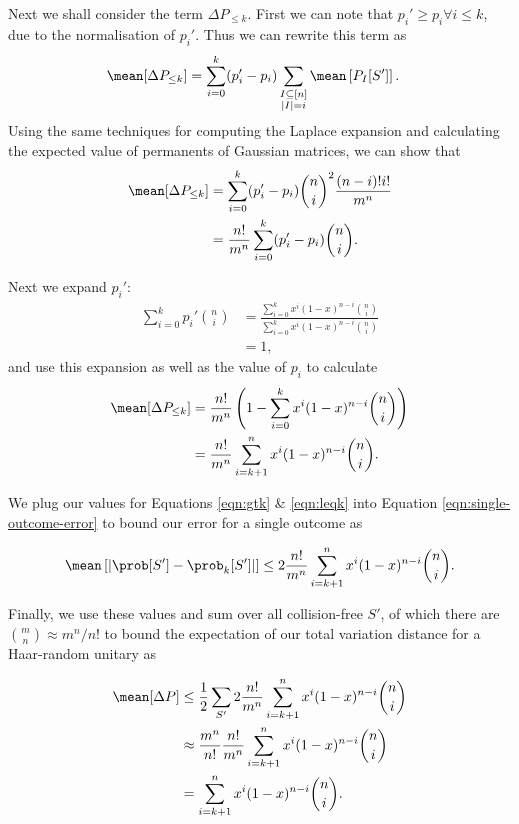 Next we shall consider the term $\Delta P_{\leq k}$. 
First we can note that $p_i' \geq p_i \forall i\leq k$, due to the normalisation of $p_i'$. 
Thus we can rewrite this term as
\begin{align}
\mean[\Delta P_{\leq k}] &= \sum_{i=0}^k(p_i'-p_i)\sum_{\substack{I\subseteq[n]\\|I|=i}}\mean\left[P_I[S']\right].
\end{align}
Using the same techniques for computing the Laplace expansion and calculating the expected value of permanents of Gaussian matrices, we can show that
\begin{align}
\mean[\Delta P_{\leq k}] &= \sum_{i=0}^k(p_i'-p_i)\binom{n}{i}^2\frac{(n-i)!i!}{m^n}\\
&= \frac{n!}{m^n}\sum_{i=0}^k(p_i'-p_i)\binom{n}{i}\label{eqn:gtk}.
\end{align}

Next we expand $p_i'$:
\begin{align}
\sum_{i=0}^kp_i'\binom{n}{i} &= \frac{\sum_{i=0}^kx^i(1-x)^{n-i}\binom{n}{i}}{\sum_{i=0}^kx^i(1-x)^{n-i}\binom{n}{i}}\\
&= 1,
\end{align}
and use this expansion as well as the value of $p_i$ to calculate
\begin{align}
\mean[\Delta P_{\leq k}] &= \frac{n!}{m^n}\left(1 - \sum_{i=0}^kx^i(1-x)^{n-i}\binom{n}{i}\right)\\
&= \frac{n!}{m^n}\sum_{i=k+1}^nx^i(1-x)^{n-i}\binom{n}{i}\label{eqn:leqk}.
\end{align}

We plug our values for Equations \ref{eqn:gtk} \& \ref{eqn:leqk} into Equation \ref{eqn:single-outcome-error} to bound our error for a single outcome as

\begin{equation}
\mean\left[|\prob[S']-\prob_k[S']|\right] \leq 2\frac{n!}{m^n}\sum_{i=k+1}^nx^i(1-x)^{n-i}\binom{n}{i}.
\end{equation}

Finally, we use these values and sum over all collision-free $S'$, of which there are $\binom{m}{n}\approx m^n/n!$ to bound the expectation of our total variation distance for a Haar-random unitary as

\begin{align}
\mean[\Delta P] &\leq \frac{1}{2}\sum_{S'}2\frac{n!}{m^n}\sum_{i=k+1}^nx^i(1-x)^{n-i}\binom{n}{i}\\
&\approx \frac{m^n}{n!}\frac{n!}{m^n}\sum_{i=k+1}^nx^i(1-x)^{n-i}\binom{n}{i}\\
&=\sum_{i=k+1}^nx^i(1-x)^{n-i}\binom{n}{i}.
\end{align}

